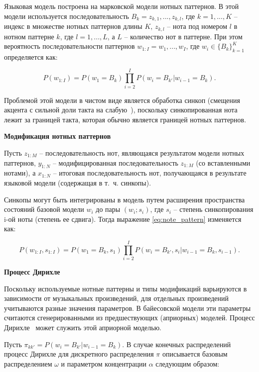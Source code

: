 Языковая модель построена на марковской модели нотных паттернов. В этой модели используется последовательность $B_k = z_{k,1}, ..., z_{k,l}$, где $k = 1, ..., K$ -- индекс в множестве нотных паттернов длины $K$, $z_{k,l}$ -- нота под номером $l$ в нотном паттерне $k$, где $l = 1, ..., L$, а $L$ -- количество нот в паттерне. При этом вероятность последовательности паттернов $w_{1:I} = w_1, ..., w_I$, где $w_i \in \{B_k\}_{k=1}^K$ определяется как:

\begin{equation}\label{eq:note_pattern}
	P(w_{1:I}) = P(w_1 = B_k) \prod_{i=2}^I P(w_i=B_{k'}|w_{i-1}=B_k).
\end{equation}

Проблемой этой модели в чистом виде является обработка синкоп (смещения акцента с сильной доли такта на слабую~\cite{syncope}), поскольку синкопированная нота лежит за границей такта, которая обычно является границей нотных паттернов.

\textbf{Модификация нотных паттернов}

Пусть $z_{1:M}$ -- последовательность нот, являющаяся результатом модели нотных паттернов, $y_{1:N}$ -- модифицированная последовательность $z_{1:M}$ (со вставленными нотами), а $x_{1:N}$ -- итоговая последовательность нот, получающаяся в результате языковой модели (содержащая в т.~ч. синкопы).

Синкопы могут быть интегрированы в модель путем расширения пространства состояний базовой модели $w_i$ до пары $(w_i; s_i)$, где $s_i$ -- степень синкопирования i-ой ноты (степень ее сдвига). Тогда выражение \ref{eq:note_pattern} изменяется как:

\begin{equation}
	P(w_{1:I}, s_{1:I}) = P(w_1 = B_k, s_1) \prod_{i=2}^I P(w_i=B_{k'}, s_i|w_{i-1}=B_k, s_{i-1}).
\end{equation}

\textbf{Процесс Дирихле}

Поскольку используемые нотные паттерны и типы модификаций варьируются в зависимости от музыкальных произведений, для отдельных произведений учитываются разные значения параметров. В байесовской модели эти параметры считаются сгенерированными из предшествующих (априорных) моделей. Процесс Дирихле~\cite{dirichlet} может служить этой априорной моделью.

Пусть $\pi_{kk'} = P(w_i=B_{k'}|w_{i-1}=B_k)$. В случае конечных распределений процесс Дирихле для дискретного распределения $\pi$ описывается базовым распределением $\omega$ и параметром концентрации $\alpha$ следующим образом:

